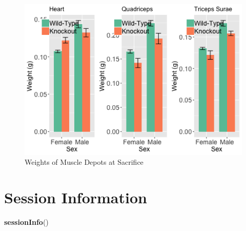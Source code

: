 \documentclass[]{article}
\newenvironment{Shaded}{\begin{snugshade}}{\end{snugshade}}
\newcommand{\KeywordTok}[1]{\textcolor[rgb]{0.13,0.29,0.53}{\textbf{#1}}}
\newcommand{\NormalTok}[1]{#1}
\begin{document}
\begin{figure}
\centering
\includegraphics{figures/muscle-weights-1.png}
\caption{Weights of Muscle Depots at Sacrifice}
\end{figure}

\section{Session Information}\label{session-information}

\begin{Shaded}
\begin{Highlighting}[]
\KeywordTok{sessionInfo}\NormalTok{()}
\end{Highlighting}
\end{Shaded}
\end{document}
